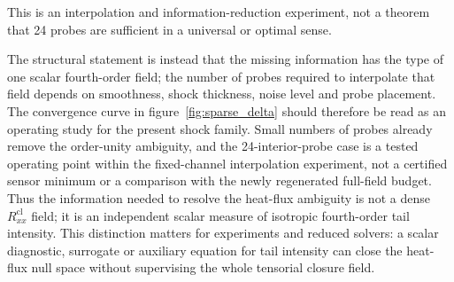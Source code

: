 \documentclass[lineno,paper]{JFM-FLM_Au}
\newenvironment{revision}{\nolinenumbers\begin{tcolorbox}[breakable,colback=revisionyellow,colframe=revisionyellow,boxrule=0pt,arc=0pt,left=5pt,right=5pt,top=5pt,bottom=5pt,before skip=6pt,after skip=6pt]\captionsetup{width=\linewidth}}{\end{tcolorbox}\linenumbers}
\newenvironment{revision}{}{}
\newcommand{\cl}{\mathrm{cl}}
\begin{document}
\begin{revision}
This is an interpolation and information-reduction experiment, not a theorem that 24 probes are sufficient in a universal or optimal sense.  
\end{revision}

\begin{revision}
The structural statement is instead that the missing information has the type of one scalar fourth-order field; the number of probes required to interpolate that field depends on smoothness, shock thickness, noise level and probe placement.  The convergence curve in figure~\ref{fig:sparse_delta} should therefore be read as an operating study for the present shock family.  Small numbers of probes already remove the order-unity ambiguity, and the 24-interior-probe case is a tested operating point within the fixed-channel interpolation experiment, not a certified sensor minimum or a comparison with the newly regenerated full-field budget.  Thus the information needed to resolve the heat-flux ambiguity is not a dense $R^{\cl}_{xx}$ field; it is an independent scalar measure of isotropic fourth-order tail intensity.  This distinction matters for experiments and reduced solvers: a scalar diagnostic, surrogate or auxiliary equation for tail intensity can close the heat-flux null space without supervising the whole tensorial closure field.
\end{revision}
\end{document}
